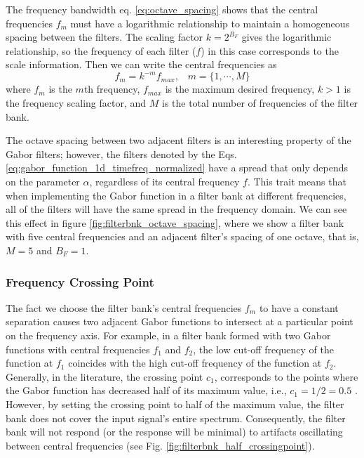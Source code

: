 \documentclass[journal]{IEEEtran}
\begin{document}
The frequency bandwidth eq. \eqref{eq:octave_spacing} shows that the central frequencies $f_m$ must have a logarithmic relationship to maintain a homogeneous spacing between the filters. The scaling factor $k=2^{B_F}$ gives the logarithmic relationship, so the frequency of each filter ($f$) in this case corresponds to the scale information. Then we can write the central frequencies as
\begin{equation}
	f_m = k^{-m} f_{max}\textrm{,} \quad m = \{1, \cdots, M\} \label{eq:filterbank_frequencies}
\end{equation} 
where $f_m$ is the $m$th frequency, $f_{max}$ is the maximum desired frequency, $k>1$ is the frequency scaling factor, and $M$ is the total number of frequencies of the filter bank.

The octave spacing between two adjacent filters is an interesting property of the Gabor filters; however, the filters denoted by the Eqs. \eqref{eq:gabor_function_1d_timefreq_normalized} have a spread that only depends on the parameter $\alpha$, regardless of its central frequency $f$. This trait means that when implementing the Gabor function in a filter bank at different frequencies, all of the filters will have the same spread in the frequency domain. We can see this effect in figure \ref{fig:filterbnk_octave_spacing}, where we show a filter bank with five central frequencies and an adjacent filter's spacing of one octave, that is, $M=5$ and $B_F = 1$. 


\subsubsection{Frequency Crossing Point}
The fact we choose the filter bank's central frequencies $f_m$ to have a constant separation causes two adjacent Gabor functions to intersect at a particular point on the frequency axis. For example, in a filter bank formed with two Gabor functions with central frequencies $f_1$ and $f_2$, the low cut-off frequency of the function at $f_1$ coincides with the high cut-off frequency of the function at $f_2$. Generally, in the literature, the crossing point $c_1$, corresponds to the points where the Gabor function has decreased half of its maximum value, i.e., $c_1= 1/2=0.5$ \cite{Granlund:CGIP:1978}. However, by setting the crossing point to half of the maximum value, the filter bank does not cover the input signal's entire spectrum. Consequently, the filter bank will not respond (or the response will be minimal) to artifacts oscillating between central frequencies (see Fig. \ref{fig:filterbnk_half_crossingpoint}).
\end{document}
